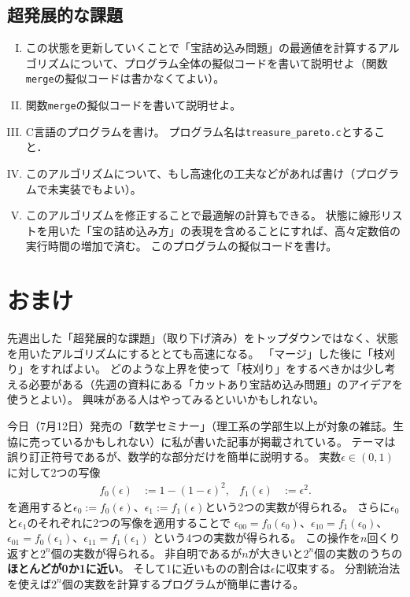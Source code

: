 \documentclass[a4paper,twoside,onecolumn,openany,article]{memoir}
\theoremstyle{remark}
\begin{document}
\subsection{超発展的な課題}
\begin{enumerate}[I.]
\item この状態を更新していくことで「宝詰め込み問題」の最適値を計算するアルゴリズムについて、プログラム全体の擬似コードを書いて説明せよ（関数\texttt{merge}の擬似コードは書かなくてよい）。
\item 関数\texttt{merge}の擬似コードを書いて説明せよ。
\item C言語のプログラムを書け。
プログラム名は\texttt{treasure\_pareto.c}とすること．
\item このアルゴリズムについて、もし高速化の工夫などがあれば書け（プログラムで未実装でもよい）。
\item このアルゴリズムを修正することで最適解の計算もできる。
状態に線形リストを用いた「宝の詰め込み方」の表現を含めることにすれば、高々定数倍の実行時間の増加で済む。
このプログラムの擬似コードを書け。
\end{enumerate}


\section{おまけ}
先週出した「超発展的な課題」（取り下げ済み）をトップダウンではなく、状態を用いたアルゴリズムにするととても高速になる。
「マージ」した後に「枝刈り」をすればよい。
どのような上界を使って「枝刈り」をするべきかは少し考える必要がある（先週の資料にある「カットあり宝詰め込み問題」のアイデアを使うとよい）。
興味がある人はやってみるといいかもしれない。

今日（7月12日）発売の「数学セミナー」（理工系の学部生以上が対象の雑誌。生協に売っているかもしれない）に私が書いた記事が掲載されている。
テーマは誤り訂正符号であるが、数学的な部分だけを簡単に説明する。
実数$\epsilon\in(0,1)$に対して2つの写像
\begin{align*}
f_0(\epsilon) &:=1-(1-\epsilon)^2,&
f_1(\epsilon) &:=\epsilon^2.
\end{align*}
を適用すると$\epsilon_0 := f_0(\epsilon)$、$\epsilon_1 := f_1(\epsilon)$という2つの実数が得られる。
さらに$\epsilon_0$と$\epsilon_1$のそれぞれに2つの写像を適用することで
$\epsilon_{00} = f_0(\epsilon_0)$、$\epsilon_{10}=f_1(\epsilon_0)$、 $\epsilon_{01}=f_0(\epsilon_1)$、$\epsilon_{11}=f_1(\epsilon_1)$
という4つの実数が得られる。
この操作を$n$回くり返すと$2^n$個の実数が得られる。
非自明であるが$n$が大きいと$2^n$個の実数のうちの\textbf{ほとんどが0か1に近い}。
そして1に近いものの割合は$\epsilon$に収束する。
分割統治法を使えば$2^n$個の実数を計算するプログラムが簡単に書ける。
\end{document}

